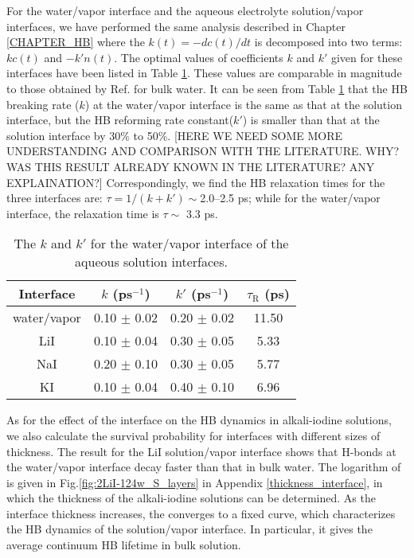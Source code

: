 For the water/vapor interface and the aqueous electrolyte solution/vapor interfaces, 
we have performed the same analysis described in Chapter \ref{CHAPTER_HB} where the $k(t)=-dc(t)/dt$ is decomposed into two terms: $kc(t)$ and $-k'n(t)$. 
The optimal values of coefficients $k$ and $k'$ given for these interfaces have been listed in Table \ref{tab:k_k_prime_pure_and_solutions}. 
These values are comparable in magnitude to those obtained by Ref. for bulk water. %
It can be seen from Table \ref{tab:k_k_prime_pure_and_solutions} that the HB breaking rate ($k$) at the water/vapor interface is the same as 
that at the solution interface, but the HB reforming rate constant($k'$) is smaller than that at the solution interface by 30\% to 50\%. 
[HERE  WE NEED SOME MORE UNDERSTANDING AND COMPARISON WITH THE LITERATURE. WHY? WAS THIS RESULT ALREADY KNOWN IN THE LITERATURE? ANY EXPLAINATION?]
Correspondingly, we find the HB relaxation times for the three interfaces are: $\tau={1}/{(k+k')} \sim $2.0--2.5 ps;
while for the water/vapor interface, the relaxation time is $\tau \sim $ 3.3 ps. 

%
\begin{table}[htbp]
\centering
\caption{\label{tab:k_k_prime_pure_and_solutions} 
    The $k$ and $k'$ for the water/vapor interface of the aqueous solution interfaces.} 
\begin{tabular}{cccc}
 Interface & $k$ (ps$^{-1}$) & $k'$ (ps$^{-1}$) & $\tau_{\text{R}}$ (ps) \\
\hline
  water/vapor & 0.10 $\pm$ 0.02 & 0.20 $\pm$ 0.02 & 11.50 \\
  LiI & 0.10 $\pm$ 0.04 & 0.30 $\pm$ 0.05 & 5.33 \\
  NaI & 0.20 $\pm$ 0.10 & 0.30 $\pm$ 0.05 & 5.77 \\
  KI  & 0.10 $\pm$ 0.04 & 0.40 $\pm$ 0.10 & 6.96 
\end{tabular}
\end{table}
As for the effect of the interface on the HB dynamics in alkali-iodine solutions,
we also calculate the survival probability for interfaces with different sizes of thickness. 
The result for the LiI solution/vapor interface shows that H-bonds at the water/vapor interface decay faster than that in bulk water.
The logarithm of \SHB is given in Fig.\thinspace\ref{fig:2LiI-124w_S_layers} in Appendix \ref{thickness_interface}, 
in which the thickness of the alkali-iodine solutions can be determined.
As the interface thickness increases, the \SHB converges to a fixed curve, 
which characterizes the HB dynamics of the solution/vapor interface. 
In particular, it gives the average continuum HB lifetime in bulk solution.
